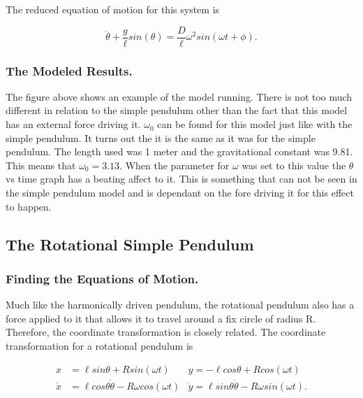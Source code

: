 \documentclass[runningheads]{llncs}
\begin{document}
The reduced equation of motion for this system is 

$$
\ddot{\theta} + \frac{g}{\ell} sin(\theta) = \frac{D}{\ell}\omega^{2} sin(\omega t + \phi).
$$

\subsubsection{The Modeled Results.}

\begin{figure}%
    \centering
\end{figure}

The figure above shows an example of the model running. There is not too much different in relation to the simple pendulum other than the fact that this model has an external force driving it. $\omega_0$ can be found for this model just like with the simple pendulum. It turns out the it is the same as it was for the simple pendulum. The length used was 1 meter and the gravitational constant was 9.81. This means that $\omega_0 = 3.13$. When the parameter for $\omega$ was set to this value the $\theta$ vs time graph has a beating affect to it. This is something that can not be seen in the simple pendulum model and is dependant on the fore driving it for this effect to happen.

%
%


\subsection{The Rotational Simple Pendulum}

\subsubsection{Finding the Equations of Motion.}

Much like the harmonically driven pendulum, the rotational pendulum also has a force applied to it that allows it to travel around a fix circle of radius R. Therefore, the coordinate transformation is closely related. The coordinate transformation for a rotational pendulum is

\begin{align*}
x &= \ell sin\theta + Rsin(\omega t) & y = - \ell cos\theta + Rcos(\omega t) \\
\dot{x} &= \ell cos\theta \dot{\theta} - R\omega cos(\omega t) & \dot{y} = \ell sin\theta \dot{\theta} - R\omega sin(\omega t). \\
\end{align*}
\end{document}
